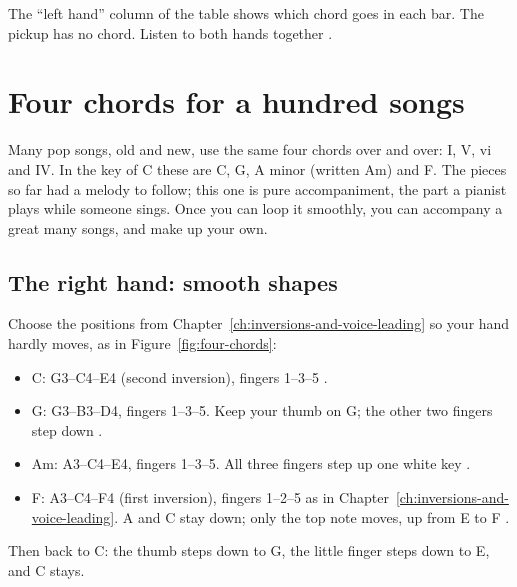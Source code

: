 The ``left hand'' column of the table shows which chord goes in each bar. The pickup has no chord. Listen to both hands together .

\section{Four chords for a hundred songs}

Many pop songs, old and new, use the same four chords over and over: I, V, vi and IV. In the key of C these are C, G, A minor (written Am) and F. The pieces so far had a melody to follow; this one is pure accompaniment, the part a pianist plays while someone sings. Once you can loop it smoothly, you can accompany a great many songs, and make up your own.

\subsection*{The right hand: smooth shapes}

Choose the positions from Chapter~\ref{ch:inversions-and-voice-leading} so your hand hardly moves, as in Figure~\ref{fig:four-chords}:
\begin{itemize}
  \item C: G3--C4--E4 (second inversion), fingers 1--3--5 .
  \item G: G3--B3--D4, fingers 1--3--5. Keep your thumb on G; the other two fingers step down .
  \item Am: A3--C4--E4, fingers 1--3--5. All three fingers step up one white key .
  \item F: A3--C4--F4 (first inversion), fingers 1--2--5 as in Chapter~\ref{ch:inversions-and-voice-leading}. A and C stay down; only the top note moves, up from E to F .
\end{itemize}
Then back to C: the thumb steps down to G, the little finger steps down to E, and C stays.


